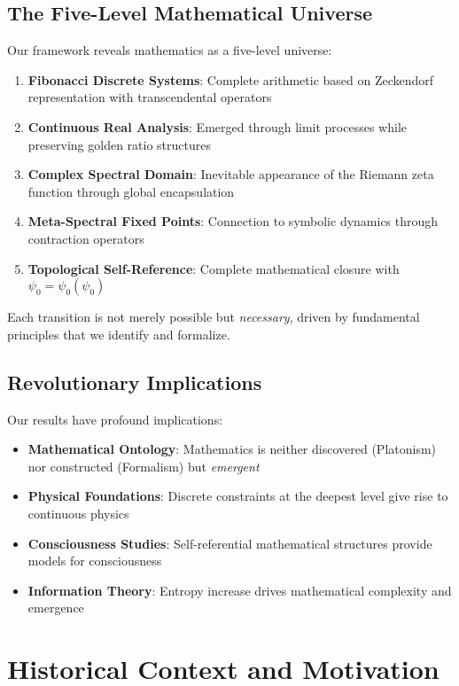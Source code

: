 \documentclass[12pt]{article}
\theoremstyle{plain}
\theoremstyle{definition}
\begin{document}
\subsection{The Five-Level Mathematical Universe}

Our framework reveals mathematics as a five-level universe:

\begin{enumerate}
\item \textbf{Fibonacci Discrete Systems}: Complete arithmetic based on Zeckendorf representation with transcendental operators
\item \textbf{Continuous Real Analysis}: Emerged through limit processes while preserving golden ratio structures
\item \textbf{Complex Spectral Domain}: Inevitable appearance of the Riemann zeta function through global encapsulation
\item \textbf{Meta-Spectral Fixed Points}: Connection to symbolic dynamics through contraction operators
\item \textbf{Topological Self-Reference}: Complete mathematical closure with $\psi_0 = \psi_0(\psi_0)$
\end{enumerate}

Each transition is not merely possible but \emph{necessary}, driven by fundamental principles that we identify and formalize.

\subsection{Revolutionary Implications}

Our results have profound implications:
\begin{itemize}
\item \textbf{Mathematical Ontology}: Mathematics is neither discovered (Platonism) nor constructed (Formalism) but \emph{emergent}
\item \textbf{Physical Foundations}: Discrete constraints at the deepest level give rise to continuous physics
\item \textbf{Consciousness Studies}: Self-referential mathematical structures provide models for consciousness
\item \textbf{Information Theory}: Entropy increase drives mathematical complexity and emergence
\end{itemize}

\section{Historical Context and Motivation}
\end{document}
